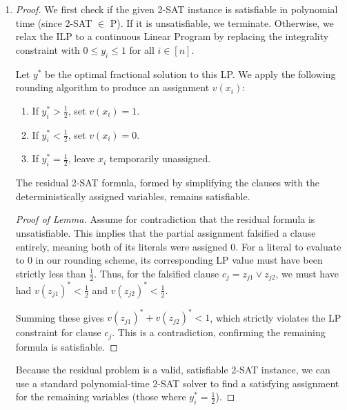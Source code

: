 \begin{enumerate}[label=(\alph*), leftmargin=*, align=left]
    \item 
    \begin{proof}
        We first check if the given 2-SAT instance is satisfiable in polynomial time (since 2-SAT $\in$ P). If it is unsatisfiable, we terminate. Otherwise, we relax the ILP to a continuous Linear Program by replacing the integrality constraint with $0 \le y_i \le 1$ for all $i \in [n]$.
        
        Let $y^*$ be the optimal fractional solution to this LP. We apply the following rounding algorithm to produce an assignment $v(x_i)$:
        \begin{enumerate}
            \item If $y^*_i > \frac{1}{2}$, set $v(x_i) = 1$.
            \item If $y^*_i < \frac{1}{2}$, set $v(x_i) = 0$.
            \item If $y^*_i = \frac{1}{2}$, leave $x_i$ temporarily unassigned.
        \end{enumerate}

        \begin{lemma}
            The residual 2-SAT formula, formed by simplifying the clauses with the deterministically assigned variables, remains satisfiable.
        \end{lemma}
        \begin{proof}[Proof of Lemma]
            Assume for contradiction that the residual formula is unsatisfiable. This implies that the partial assignment falsified a clause entirely, meaning both of its literals were assigned $0$. For a literal to evaluate to $0$ in our rounding scheme, its corresponding LP value must have been strictly less than $\frac{1}{2}$. Thus, for the falsified clause $c_j = z_{j1} \vee z_{j2}$, we must have had $v(z_{j1})^* < \frac{1}{2}$ and $v(z_{j2})^* < \frac{1}{2}$. 
            
            Summing these gives $v(z_{j1})^* + v(z_{j2})^* < 1$, which strictly violates the LP constraint for clause $c_j$. This is a contradiction, confirming the remaining formula is satisfiable.
        \end{proof}

        Because the residual problem is a valid, satisfiable 2-SAT instance, we can use a standard polynomial-time 2-SAT solver to find a satisfying assignment for the remaining variables (those where $y^*_i = \frac{1}{2}$). 
        

\end{proof}
\end{enumerate}
